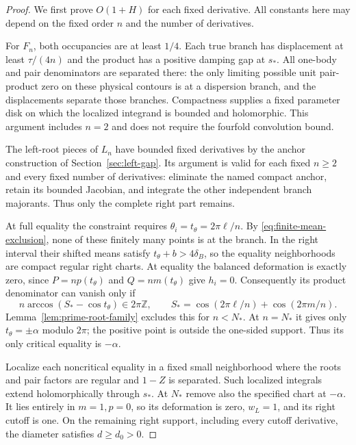 \documentclass[11pt]{article}
\numberwithin{equation}{section}
\theoremstyle{remark}\newtheorem{remark}[theorem]{Remark}
\begin{document}
\begin{proof}
We first prove $O(1+H)$ for each fixed derivative. All
constants here may depend on the fixed order $n$ and the
number of derivatives.

For $F_n$, both occupancies are at least $1/4$. Each true
branch has displacement at least $\tau/(4n)$ and the product
has a positive damping gap at $s_*$. All one-body and pair
denominators are separated there: the only limiting possible
unit pair-product zero on these physical contours is at a
dispersion branch, and the displacements separate those
branches. Compactness supplies a fixed parameter disk on
which the localized integrand is bounded and holomorphic.
This argument includes $n=2$ and does not require the
fourfold convolution bound.

The left-root pieces of $L_n$ have bounded fixed derivatives
by the anchor construction of Section~\ref{sec:left-gap}.
Its argument is valid for each fixed $n\ge2$ and every
fixed number of derivatives: eliminate the named compact
anchor, retain its bounded Jacobian, and integrate the other
independent branch majorants. Thus only the complete right
part remains.

At full equality the constraint requires
$\theta_i=t_\theta=2\pi\ell/n$. By
\eqref{eq:finite-mean-exclusion}, none of these finitely many
points is at the branch. In the right interval their shifted
means satisfy $t_\theta+b>4\delta_B$, so the equality
neighborhoods are compact regular right charts. At equality
the balanced deformation is exactly zero, since
$P=np(t_\theta)$ and $Q=nm(t_\theta)$ give $h_i=0$.
Consequently its product denominator can vanish only if
\[
 n\arccos(S_*-\cos t_\theta)\in2\pi\mathbb Z,
 \qquad
 S_* = \cos(2\pi\ell/n)+\cos(2\pi m/n).
\]
Lemma~\ref{lem:prime-root-family} excludes this for $n<N_*$.
At $n=N_*$ it gives only $t_\theta=\pm\alpha$ modulo
$2\pi$; the positive point is outside the one-sided support.
Thus its only critical equality is $-\alpha$.

Localize each noncritical equality in a fixed small
neighborhood where the roots and pair factors are regular
and $1-Z$ is separated. Such localized integrals extend
holomorphically through $s_*$. At $N_*$ remove also the
specified chart at $-\alpha$. It lies entirely in $m=1,p=0$,
so its deformation is zero, $w_L=1$, and its right cutoff
is one. On the remaining right support, including every
cutoff derivative, the diameter satisfies $d\ge d_0>0$.


\end{proof}
\end{document}
